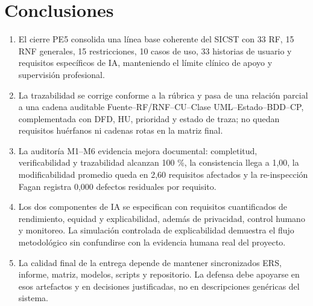 \documentclass[12pt,a4paper]{article}
\begin{document}
\section{Conclusiones}
\begin{enumerate}
\item El cierre PE5 consolida una línea base coherente del SICST con 33 RF, 15 RNF generales, 15 restricciones, 10 casos de uso, 33 historias de usuario y requisitos específicos de IA, manteniendo el límite clínico de apoyo y supervisión profesional.
\item La trazabilidad se corrige conforme a la rúbrica y pasa de una relación parcial a una cadena auditable Fuente--RF/RNF--CU--Clase UML--Estado--BDD--CP, complementada con DFD, HU, prioridad y estado de traza; no quedan requisitos huérfanos ni cadenas rotas en la matriz final.
\item La auditoría M1--M6 evidencia mejora documental: completitud, verificabilidad y trazabilidad alcanzan 100 \%, la consistencia llega a 1,00, la modificabilidad promedio queda en 2,60 requisitos afectados y la re-inspección Fagan registra 0,000 defectos residuales por requisito.
\item Los dos componentes de IA se especifican con requisitos cuantificados de rendimiento, equidad y explicabilidad, además de privacidad, control humano y monitoreo. La simulación controlada de explicabilidad demuestra el flujo metodológico sin confundirse con la evidencia humana real del proyecto.
\item La calidad final de la entrega depende de mantener sincronizados ERS, informe, matriz, modelos, scripts y repositorio. La defensa debe apoyarse en esos artefactos y en decisiones justificadas, no en descripciones genéricas del sistema.
\end{enumerate}
\end{document}
